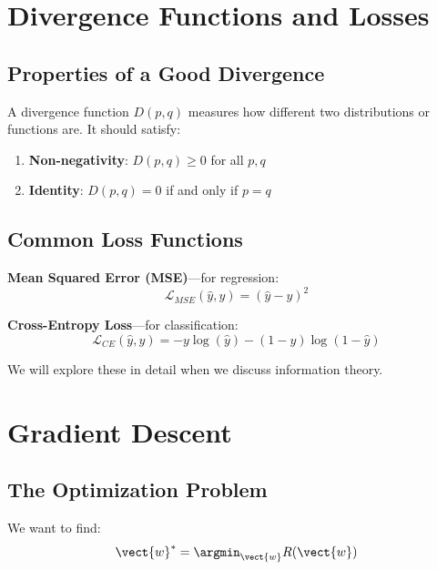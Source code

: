 
\section{Divergence Functions and Losses}

\subsection{Properties of a Good Divergence}

A divergence function $D(p, q)$ measures how different two distributions or functions are. It should satisfy:

\begin{enumerate}
    \item \textbf{Non-negativity}: $D(p, q) \geq 0$ for all $p, q$
    \item \textbf{Identity}: $D(p, q) = 0$ if and only if $p = q$
\end{enumerate}

\subsection{Common Loss Functions}

\textbf{Mean Squared Error (MSE)}---for regression:
\[
\mathcal{L}_{MSE}(\hat{y}, y) = (\hat{y} - y)^2
\]

\textbf{Cross-Entropy Loss}---for classification:
\[
\mathcal{L}_{CE}(\hat{y}, y) = -y \log(\hat{y}) - (1-y) \log(1-\hat{y})
\]

We will explore these in detail when we discuss information theory.


\section{Gradient Descent}

\subsection{The Optimization Problem}

We want to find:
\[
\vect{w}^* = \argmin_{\vect{w}} R(\vect{w})
\]

